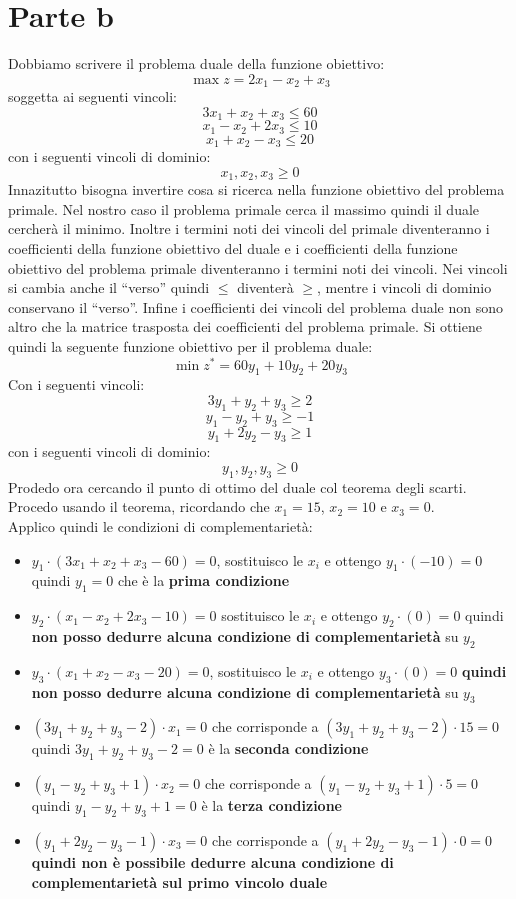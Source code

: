 \documentclass[a4paper,12pt, oneside]{book}
\begin{document}
\section{Parte b}
Dobbiamo scrivere il problema duale della funzione obiettivo:
\[\max z=2x_1-x_2+x_3\]
soggetta ai seguenti vincoli:
\[3x_1+x_2+x_3\leq 60\]
\[x_1-x_2+2x_3\leq 10\]
\[x_1+x_2-x_3 \leq 20\]
con i seguenti vincoli di dominio:
\[x_1,x_2,x_3\geq 0\]
Innazitutto bisogna invertire cosa si ricerca nella funzione obiettivo
del problema primale. Nel nostro caso il problema primale cerca il
massimo quindi il duale cercherà il minimo. Inoltre i termini noti
dei vincoli del primale diventeranno i coefficienti della funzione
obiettivo del duale e i coefficienti della funzione obiettivo del
problema primale diventeranno i termini noti dei vincoli. Nei vincoli
si cambia anche il ``verso'' quindi $\leq$ diventerà $\geq$, mentre i
vincoli di dominio conservano il ``verso''. Infine i coefficienti dei
vincoli del problema duale non sono altro che la matrice trasposta dei
coefficienti del problema primale.
\newpage
Si ottiene quindi la seguente
funzione obiettivo per il problema duale:
\[\min z^*=60y_1+10y_2+20y_3\]
Con i seguenti vincoli:
\[3y_1+y_2+y_3\geq 2\]
\[y_1-y_2+y_3\geq -1\]
\[y_1+2y_2-y_3\geq 1\]
con i seguenti vincoli di dominio:
\[y_1,y_2,y_3\geq 0\]
Prodedo ora cercando il punto di ottimo del duale col teorema degli
scarti.\\
Procedo usando il teorema, ricordando che $x_1=15$, $x_2=10$ e
$x_3=0$.\\
Applico quindi le condizioni di complementarietà:
\begin{itemize}
  \item $y_1\cdot(3x_1+x_2+x_3-60)=0$, sostituisco le $x_i$ e ottengo
  $y_1\cdot (-10)=0$ quindi $y_1=0$ che è la \textbf{prima condizione}
  \item $y_2\cdot(x_1-x_2+2x_3-10)=0$  sostituisco le $x_i$ e ottengo
  $y_2\cdot (0)=0$ quindi\textbf{ non posso dedurre alcuna condizione di
  complementarietà} su $y_2$
  \item $y_3\cdot(x_1+x_2-x_3-20)=0$, sostituisco le $x_i$ e ottengo
  $y_3\cdot (0)=0$ \textbf{quindi non posso dedurre alcuna condizione di
    complementarietà} su $y_3$
  \item $(3y_1+y_2+y_3-2)\cdot x_1=0$ che corrisponde a
  $(3y_1+y_2+y_3-2)\cdot 15=0$ quindi $3y_1+y_2+y_3-2=0$ è la
  \textbf{seconda condizione}
  \item $(y_1-y_2+y_3+1)\cdot x_2=0$ che corrisponde a
  $(y_1-y_2+y_3+1)\cdot 5=0$ quindi $y_1-y_2+y_3+1=0$ è la
  \textbf{terza condizione}
  \item $(y_1+2y_2-y_3-1)\cdot x_3=0$ che corrisponde a
  $(y_1+2y_2-y_3-1)\cdot 0=0$ \textbf{quindi non è possibile dedurre alcuna
    condizione di complementarietà sul primo vincolo duale}
\end{itemize}
\end{document}
